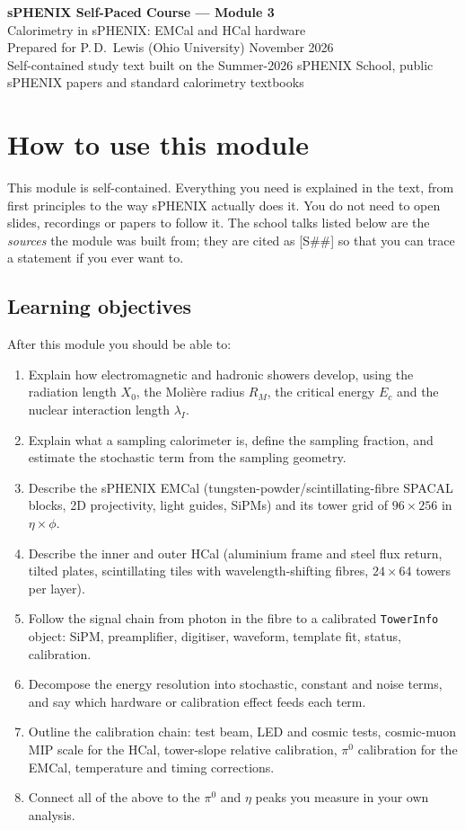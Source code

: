 \documentclass[11pt,letterpaper]{article}
\newcommand{\code}[1]{\texttt{#1}}
\begin{document}
\begin{center}{\LARGE\bfseries sPHENIX Self-Paced Course --- Module 3}\\[4pt]
{\Large Calorimetry in sPHENIX: EMCal and HCal hardware}\\[8pt]
Prepared for P.\,D.\ Lewis (Ohio University) \quad November 2026\\[2pt]
\small Self-contained study text built on the Summer-2026 sPHENIX School, public sPHENIX papers and standard calorimetry textbooks\end{center}

\tableofcontents
\newpage

\section*{How to use this module}
This module is self-contained.
Everything you need is explained in the text, from first principles to the way sPHENIX actually does it.
You do not need to open slides, recordings or papers to follow it.
The school talks listed below are the \emph{sources} the module was built from; they are cited as [S\#\#] so that you can trace a statement if you ever want to.

\subsection*{Learning objectives}
After this module you should be able to:
\begin{enumerate}[label=O\arabic*.]
\item Explain how electromagnetic and hadronic showers develop, using the radiation length $X_0$, the Moli\`ere radius $R_M$, the critical energy $E_c$ and the nuclear interaction length $\lambda_I$.
\item Explain what a sampling calorimeter is, define the sampling fraction, and estimate the stochastic term from the sampling geometry.
\item Describe the sPHENIX EMCal (tungsten-powder/scintillating-fibre SPACAL blocks, 2D projectivity, light guides, SiPMs) and its tower grid of $96\times256$ in $\eta\times\phi$.
\item Describe the inner and outer HCal (aluminium frame and steel flux return, tilted plates, scintillating tiles with wavelength-shifting fibres, $24\times64$ towers per layer).
\item Follow the signal chain from photon in the fibre to a calibrated \code{TowerInfo} object: SiPM, preamplifier, digitiser, waveform, template fit, status, calibration.
\item Decompose the energy resolution into stochastic, constant and noise terms, and say which hardware or calibration effect feeds each term.
\item Outline the calibration chain: test beam, LED and cosmic tests, cosmic-muon MIP scale for the HCal, tower-slope relative calibration, $\pi^0$ calibration for the EMCal, temperature and timing corrections.
\item Connect all of the above to the $\pi^0$ and $\eta$ peaks you measure in your own analysis.
\end{enumerate}
\end{document}
